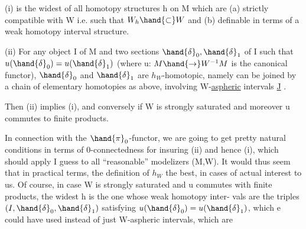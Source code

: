 (i)   is the widest of all homotopy structures  h on M which are
(a)   strictly compatible with W  i.e. such that $W_h\hand{\subset}W$  and 
(b)  definable in terms of a weak homotopy interval structure.

(ii)  For any object I of M and two sections $\hand{\delta}_0,\hand{\delta}_1$ of I such that
$u(\hand{\delta}_0)=u(\hand{\delta}_1)$  (where u: $M\hand{\rightarrow}W^{-1}M$ is the canonical functor), $\hand{\delta}_0$ and $\hand{\delta}_1$ are
$h_W$-homotopic,  namely can be joined by a chain of elementary homotopies
as above,  involving  W-\uline{aspheric}\hand{*} intervals \underline{J} .

Then (ii) implies (i),  and conversely if W is strongly saturated\hand{\unsure{,}}
and moreover u commutes to finite products.

In connection with the $\hand{\pi}_0$-functor,  we are going to get pretty
natural conditions  in terms of 0-connectedness for insuring (ii)
and hence (i),  which should apply I guess to all ``reasonable'' modelizers
(M,W).    It would thus seem that  in practical terms,
the definition of $h_W$  the best,  in  cases of actual interest to us.
Of course,  in case W is strongly saturated and u commutes with finite
products,  the widest h is the one  whose weak homotopy inter-%
vals are the triples $(I,\hand{\delta}_0,\hand{\delta}_1)$  satisfying $u(\hand{\delta}_0) = u(\hand{\delta}_1)$,  which e could
have used instead of just W-aspheric intervals,   which are

